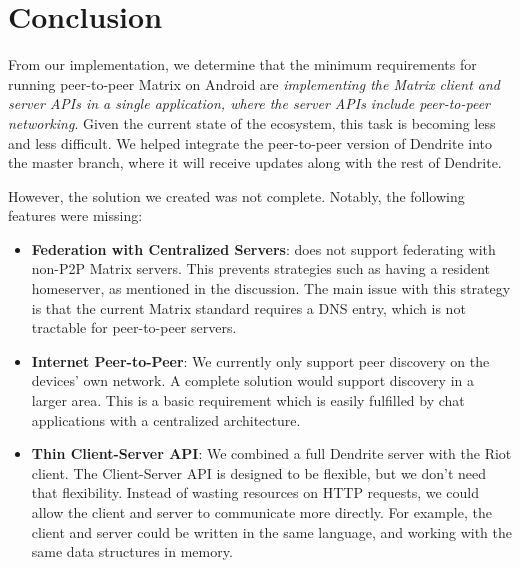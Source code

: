 \chapter{Conclusion}


From our implementation, we determine that the minimum requirements for running peer-to-peer Matrix on Android are \textit{implementing the Matrix client and server \ac{API}s in a single application, where the server \ac{API}s include peer-to-peer networking}.
Given the current state of the ecosystem, this task is becoming less and less difficult.
We helped integrate the peer-to-peer version of Dendrite into the master branch, where it will receive updates along with the rest of Dendrite.

However, the solution we created was not complete.
Notably, the following features were missing:
\begin{itemize}
	\item{
	      \textbf{Federation with Centralized Servers}:
	       does not support federating with non-P2P Matrix servers.
	      This prevents strategies such as having a resident homeserver, as mentioned in the discussion.
	      The main issue with this strategy is that the current Matrix standard requires a DNS entry, which is not tractable for peer-to-peer servers.
	      }
	\item{
	      \textbf{Internet Peer-to-Peer}:
	      We currently only support peer discovery on the devices' own network.
	      A complete solution would support discovery in a larger area.
	      This is a basic requirement which is easily fulfilled by chat applications with a centralized architecture.
	      }
	\item{
	      \textbf{Thin Client-Server API}:
	      We combined a full Dendrite server with the Riot client.
	      The Client-Server API is designed to be flexible, but we don't need that flexibility.
	      Instead of wasting resources on HTTP requests, we could allow the client and server to communicate more directly.
	      For example, the client and server could be written in the same language, and working with the same data structures in memory.
	      }
\end{itemize}